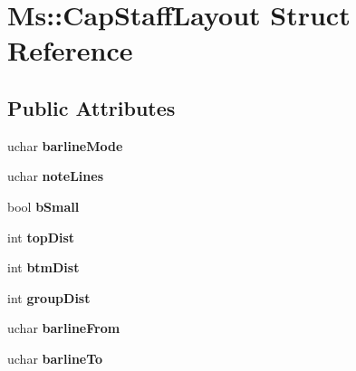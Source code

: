 \hypertarget{struct_ms_1_1_cap_staff_layout}{}\section{Ms\+:\+:Cap\+Staff\+Layout Struct Reference}
\label{struct_ms_1_1_cap_staff_layout}
\subsection*{Public Attributes}
\begin{DoxyCompactItemize}
\item 
\mbox{\label{struct_ms_1_1_cap_staff_layout_aa33cbe5bcd40aa75ed7ef138144ecab4}} 
uchar {\bfseries barline\+Mode}
\item 
\mbox{\label{struct_ms_1_1_cap_staff_layout_a5e540e4ade40d8a904ceb0e8d6526770}} 
uchar {\bfseries note\+Lines}
\item 
\mbox{\label{struct_ms_1_1_cap_staff_layout_afd3f5d78b482f0eb77d4a29e6b2d6f93}} 
bool {\bfseries b\+Small}
\item 
\mbox{\label{struct_ms_1_1_cap_staff_layout_a066237db065b0e111406d20544c2107c}} 
int {\bfseries top\+Dist}
\item 
\mbox{\label{struct_ms_1_1_cap_staff_layout_a9335ca0352adf138b2a32b1518d4ddb3}} 
int {\bfseries btm\+Dist}
\item 
\mbox{\label{struct_ms_1_1_cap_staff_layout_a988c66dccb3bf67b58289b098558eaf8}} 
int {\bfseries group\+Dist}
\item 
\mbox{\label{struct_ms_1_1_cap_staff_layout_a92e0e69756fc99ee0976964687f2a126}} 
uchar {\bfseries barline\+From}
\item 
\mbox{\label{struct_ms_1_1_cap_staff_layout_aeb30c85e935e3ee4d4f60e097fa72ee7}} 
uchar {\bfseries barline\+To}
\item 
\mbox{\label{struct_ms_1_1_cap_staff_layout_ade82101132760d25e00b3c734b4d9bc5}} 

\end{DoxyCompactItemize}
